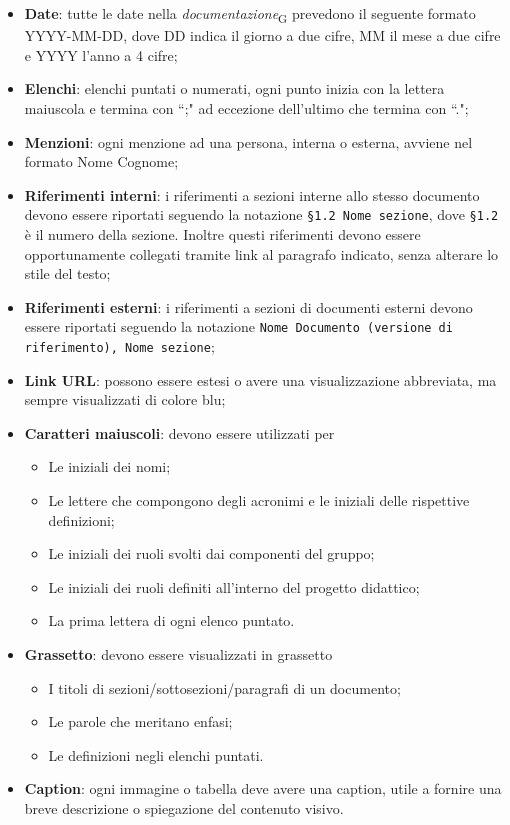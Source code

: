 \begin{itemize}
    \item \textbf{Date}: tutte le date nella \textit{documentazione}\textsubscript{G} prevedono il seguente formato YYYY-MM-DD, dove DD indica il giorno a due cifre, MM il mese a due cifre e YYYY l'anno a 4 cifre;
    \item \textbf{Elenchi}: elenchi puntati o numerati, ogni punto inizia con la lettera maiuscola e termina con ``;" ad eccezione dell'ultimo che termina con ``.";
    \item \textbf{Menzioni}: ogni menzione ad una persona, interna o esterna, avviene nel formato Nome Cognome;
    \item \textbf{Riferimenti interni}: i riferimenti a sezioni interne allo stesso documento devono essere riportati seguendo la notazione \texttt{§1.2 Nome sezione}, dove \texttt{§1.2} è il numero della sezione. Inoltre questi riferimenti devono essere opportunamente collegati tramite link al paragrafo indicato, senza alterare lo stile del testo;
    \item \textbf{Riferimenti esterni}: i riferimenti a sezioni di documenti esterni devono essere riportati seguendo la notazione \texttt{Nome Documento (versione di riferimento), Nome sezione};
     \item \textbf{Link URL}: possono essere estesi o avere una visualizzazione abbreviata, ma sempre visualizzati di colore blu;
    \item \textbf{Caratteri maiuscoli}: devono essere utilizzati per
        \begin{itemize}
            \item Le iniziali dei nomi;
            \item Le lettere che compongono degli acronimi e le iniziali delle rispettive definizioni;
            \item Le iniziali dei ruoli svolti dai componenti del gruppo;
            \item Le iniziali dei ruoli definiti all'interno del progetto didattico;
            \item La prima lettera di ogni elenco puntato.
        \end{itemize}
    \item \textbf{Grassetto}: devono essere visualizzati in grassetto
        \begin{itemize}
            \item I titoli di sezioni/sottosezioni/paragrafi di un documento;
            \item Le parole che meritano enfasi;
            \item Le definizioni negli elenchi puntati.
        \end{itemize}
    \item \textbf{Caption}: ogni immagine o tabella deve avere una caption, utile a fornire una breve descrizione o spiegazione del contenuto visivo.
\end{itemize}

